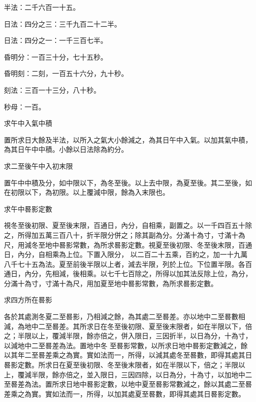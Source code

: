 \begin{pinyinscope}
 半法：二千六百一十五。



 日法：四分之三：三千九百二十二半。



 日法：四分之一：一千三百七半。



 昏明分：一百三十分，七十五秒。



 昏明刻：二刻，一百五十六分，九十秒。



 刻法：三百一十三分，八十秒。



 秒母：一百。



 求午中入氣中積



 置所求日大餘及半法，以所入之氣大小餘減之，為其日午中入氣。以加其氣中積，為其日午中中積。小餘以日法除為約分。



 求二至後午中入初末限



 置午中中積及分，如中限以下，為冬至後。以上去中限，為夏至後。其二至後，如在初限以下，為初限。以上覆減中限，餘為入末限也。



 求午中晷影定數



 視冬至後初限、夏至後末限，百通日，內分，自相乘，副置之。以一千四百五十除之，所得加五萬三百八十，折半限分併之；除其副為分。分滿十為寸，寸滿十為尺，用減冬至地中晷影常數，為所求晷影定數。視夏至後初限、冬至後末限，百通日，內分，自相乘為上位。下置入限分，
 以二百二十五乘，百約之，加一十九萬八千七十五為法。夏至前後半限以上者，減去半限，列於上位。下位置半限。各百通日，內分，先相減，後相乘。以七千七百除之，所得以加其法反除上位，為分，分滿十為寸，寸滿十為尺，用加夏至地中晷影常數，為所求晷影定數。



 求四方所在晷影



 各於其處測冬夏二至晷影，乃相減之餘，為其處二至晷差。亦以地中二至晷數相減，為地中二至晷差。其所求日在冬至後初限、夏至後末限者，如在半限以下，倍之；半限以上，覆減半限，餘亦倍之，併入限日，三因折半，以日為分，十為寸，以減地中二至晷差為法。置地中冬
 至晷影常數，以所求日地中晷影定數減之，餘以其年二至晷差乘之為實。實如法而一，所得，以減其處冬至晷數，即得其處其日晷影定數。所求日在夏至後初限、冬至後末限者，如在半限以下，倍之；半限以上，覆減半限，餘亦倍之，並入限日，三因四除，以日為分，十為寸，以加地中二至晷差為法。置所求日地中晷影定數，以地中夏至晷影常數減之，餘以其處二至晷差乘之為實。實如法而一，所得，以加其處夏至晷數，即得其處其日晷影定數。




\end{pinyinscope}
